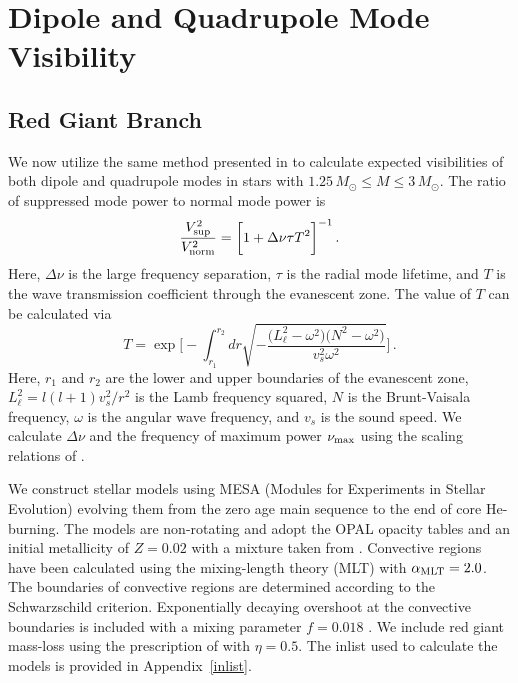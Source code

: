 \section{Dipole and Quadrupole Mode Visibility}\label{visibility}


\subsection{Red Giant Branch}
\label{rgb}


We now utilize the same method presented in \citet{Fuller_2015} to calculate expected visibilities of both dipole and quadrupole modes in stars with $1.25 \, M_\odot \leq M \leq 3 \, M_\odot$. The ratio of suppressed mode power to normal mode power is
\begin{equation}
\label{eqn:vsup}
\frac{V_{\rm sup}^2}{V_{\rm norm}^2} = \bigg[ 1 + \Delta \nu \tau T^2 \bigg]^{-1} \, .
\end{equation}
Here, $\Delta \nu$ is the large frequency separation, $\tau$ is the radial mode lifetime, and $T$ is the wave transmission coefficient through the evanescent zone. The value of $T$ can be calculated via
\begin{equation}
\label{eqn:T}
T  = \exp \bigg[ - \int^{r_2}_{r_1} dr \sqrt{ - \frac{ \big( L_\ell^2 - \omega^2 \big) \big(N^2 - \omega^2 \big) }{v_s^2 \omega^2} } \bigg] \, .
\end{equation}
Here, $r_1$ and $r_2$ are the lower and upper boundaries of the evanescent zone, $L_\ell^2 = l(l+1)v_s^2/r^2$ is the Lamb frequency squared, $N$ is the Brunt-Vaisala frequency, $\omega$ is the angular wave frequency, and $v_s$ is the sound speed. We calculate $\Delta \nu$ and the frequency of maximum power $\nu_{\rm max}$ using the scaling relations of \cite{Huber_2011}.

We construct stellar models using MESA (Modules for Experiments in Stellar Evolution) \citep[MESA,release 7456][]{Paxton_2010,Paxton_2013,Paxton_2015} evolving them from the zero age main sequence to the end of core He-burning. The models are non-rotating and adopt the OPAL opacity tables \citep{Iglesias:96} and an initial metallicity of $Z=0.02$ with a mixture taken from \citet{Asplund:2005}.  
Convective regions have been calculated using the mixing-length theory (MLT) with $\alpha_{\rm MLT}=2.0$. The boundaries of convective regions are determined according to the Schwarzschild criterion. Exponentially decaying overshoot at the convective boundaries is included with a mixing parameter $f=0.018$ \citep{2000A&A...360..952H,Paxton_2010}. We include red giant mass-loss using the prescription of \citet{Reimers:1975} with $\eta=0.5$. The inlist used to calculate the models is provided in Appendix~\ref{inlist}.
  

